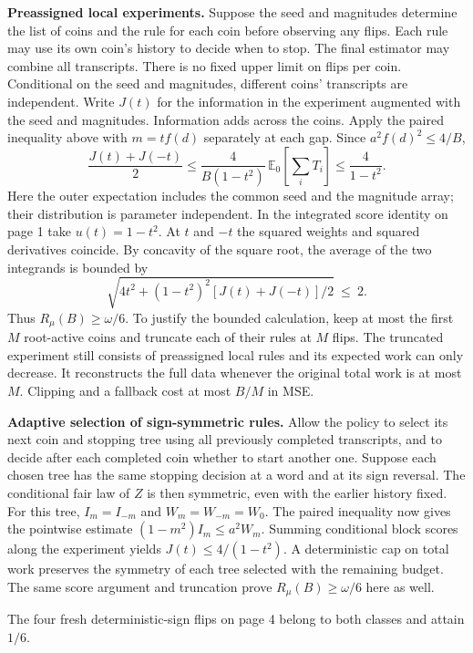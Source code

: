 \documentclass[11pt]{article}
\newcommand{\E}{\mathbb E}
\begin{document}
\textbf{Preassigned local experiments.} Suppose the seed and magnitudes determine the list of coins and the rule for each coin before observing any flips. Each rule may use its own coin's history to decide when to stop. The final estimator may combine all transcripts. There is no fixed upper limit on flips per coin. Conditional on the seed and magnitudes, different coins' transcripts are independent. Write $J(t)$ for the information in the experiment augmented with the seed and magnitudes. Information adds across the coins. Apply the paired inequality above with $m=t f(d)$ separately at each gap. Since $a^2 f(d)^2\le4/B$,
\[
 \frac{J(t)+J(-t)}{2}
 \le\frac{4}{B(1-t^2)}\,
       \E_0\!\left[\sum_i T_i\right]
 \le\frac{4}{1-t^2}.
\]
Here the outer expectation includes the common seed and the magnitude array; their distribution is parameter independent. In the integrated score identity on page 1 take $u(t)=1-t^2$. At $t$ and $-t$ the squared weights and squared derivatives coincide. By concavity of the square root, the average of the two integrands is bounded by
\[
 \sqrt{4t^2+(1-t^2)^2[J(t)+J(-t)]/2}\ \le\ 2 .
\]
Thus $R_\mu(B)\ge\omega/6$. To justify the bounded calculation, keep at most the first $M$ root-active coins and truncate each of their rules at $M$ flips. The truncated experiment still consists of preassigned local rules and its expected work can only decrease. It reconstructs the full data whenever the original total work is at most $M$. Clipping and a fallback cost at most $B/M$ in MSE.

\textbf{Adaptive selection of sign-symmetric rules.} Allow the policy to select its next coin and stopping tree using all previously completed transcripts, and to decide after each completed coin whether to start another one. Suppose each chosen tree has the same stopping decision at a word and at its sign reversal. The conditional fair law of $Z$ is then symmetric, even with the earlier history fixed. For this tree, $I_m=I_{-m}$ and $W_m=W_{-m}=W_0$. The paired inequality now gives the pointwise estimate $(1-m^2)I_m\le a^2W_m$. Summing conditional block scores along the experiment yields $J(t)\le4/(1-t^2)$. A deterministic cap on total work preserves the symmetry of each tree selected with the remaining budget. The same score argument and truncation prove $R_\mu(B)\ge\omega/6$ here as well.

The four fresh deterministic-sign flips on page 4 belong to both classes and attain $1/6$.
\end{document}
